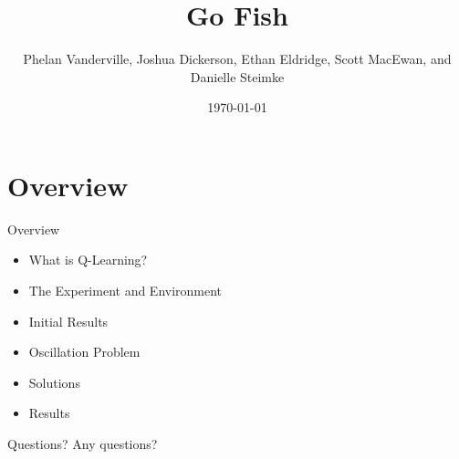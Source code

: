 \documentclass[compress, blue]{beamer}
\begin{document}
\title{Go Fish}   
\author{Phelan Vanderville, Joshua Dickerson, Ethan Eldridge, Scott MacEwan, and Danielle Steimke} 
\date{\today} 



\begin{frame}
\maketitle
\end{frame}

\section{Overview}

\begin{frame}{Overview}

\begin{itemize}
\item<1>What is Q-Learning?
\item<2>The Experiment and Environment
\item<3>Initial Results
\item<4>Oscillation Problem
\item<5>Solutions
\item<6>Results
\end{itemize}

\end{frame}

\begin{frame}{Questions?}
Any questions?
\end{frame}
\end{document}
